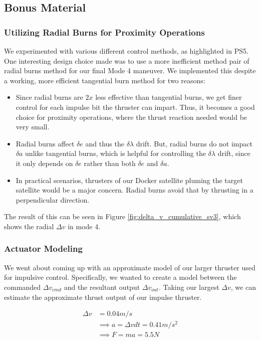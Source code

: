 \subsection{Bonus Material}
\subsubsection{Utilizing Radial Burns for Proximity Operations}
We experimented with various different control methods, as highlighted in PS5. One interesting design choice made was to use a more inefficient method pair of radial burns method for our final Mode 4 maneuver. We implemented this despite a working, more efficient tangential burn method for two reasons:
\begin{itemize}
    \item Since radial burns are $2x$ less effective than tangential burns, we get finer control for each impulse bit the thruster can impart. Thus, it becomes a good choice for proximity operations, where the thrust reaction needed would be very small.
    \item Radial burns affect $\delta e$ and thus the $\delta \lambda$ drift. But, radial burns do not impact $\delta a$ unlike tangential burns, which is helpful for controlling the $\delta \lambda$ drift, since it only depends on $\delta e$ rather than both $\delta e$ and $\delta a$.
    \item In practical scenarios, thrusters of our Docker satellite pluming the target satellite would be a major concern. Radial burns avoid that by thrusting in a perpendicular direction.
\end{itemize}

The result of this can be seen in Figure \ref{fig:delta_v_cumulative_sv3}, which shows the radial $\Delta v$ in mode 4.

\subsubsection{Actuator Modeling}
We went about coming up with an approximate model of our larger thruster used for impulsive control. Specifically, we wanted to create a model between the commanded $\Delta v_{cmd}$ and the resultant output $\Delta v_{out}$. Taking our largest $\Delta v$, we can estimate the approximate thrust output of our impulse thruster.

\begin{align}
    \Delta v &= 0.04 m/s \\
    &\implies a = \Delta v dt = 0.41 m/s^2 \\
    &\implies F = ma = 5.5 N
\end{align}

